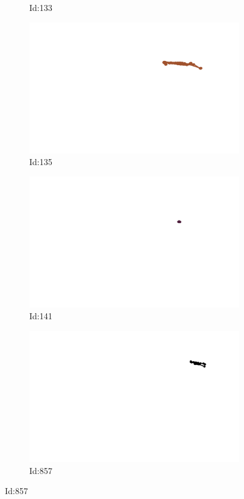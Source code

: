 \documentclass[12pt,twoside]{report}
\begin{document}
\begin{figure}
\begin{subfigure}[b]{0.20\textwidth}
\caption{Id:133}
\end{subfigure}
\begin{subfigure}[b]{0.20\textwidth}
\centering
\includegraphics[width=\textwidth]{../../trajectories/135.png}
\caption{Id:135}
\end{subfigure}
\begin{subfigure}[b]{0.20\textwidth}
\centering
\includegraphics[width=\textwidth]{../../trajectories/141.png}
\caption{Id:141}
\end{subfigure}
\begin{subfigure}[b]{0.20\textwidth}
\centering
\includegraphics[width=\textwidth]{../../trajectories/857.png}
\caption{Id:857}
\end{subfigure}
\end{figure}
\end{document}
